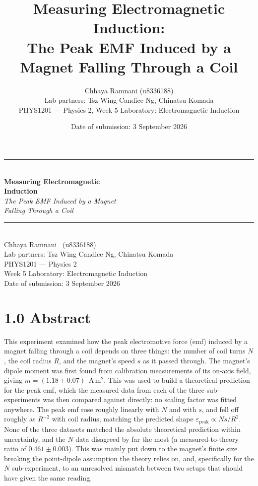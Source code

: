 \documentclass{article}
\title{\textbf{\Large Measuring Electromagnetic Induction:\\[2pt] The Peak EMF Induced by a Magnet Falling Through a Coil}}
\author{Chhaya Ramnani (u8336188)\\ \small Lab partners: Tsz Wing Candice Ng, Chinatsu Komada\\ \small PHYS1201 --- Physics 2, Week 5 Laboratory: Electromagnetic Induction}
\date{Date of submission: 3 September 2026}
\begin{document}
 
\begin{titlepage}
\centering
\vspace*{3cm}
{\color{indigoline}\rule{0.5\linewidth}{0.6pt}}\\[0.6cm]
{\Huge\bfseries\color{indigo} Measuring Electromagnetic\\[4pt] Induction}\\[10pt]
{\Large\itshape The Peak EMF Induced by a Magnet\\ Falling Through a Coil}\\[0.6cm]
{\color{indigoline}\rule{0.5\linewidth}{0.6pt}}\\[1.8cm]
{\large Chhaya Ramnani \ \textnormal{(u8336188)}}\\[6pt]
{\normalsize Lab partners: Tsz Wing Candice Ng, Chinatsu Komada}\\[1.4cm]
{\normalsize PHYS1201 --- Physics 2}\\
{\normalsize Week 5 Laboratory: Electromagnetic Induction}\\[1.2cm]
{\normalsize Date of submission: 3 September 2026}
\vfill
\end{titlepage}
 
\setcounter{page}{1}
 
\section*{1.0 Abstract}
This experiment examined how the peak electromotive force (emf) induced by a magnet falling 
through a coil depends on three things: the number of coil turns $N$, the coil radius $R$, and 
the magnet's speed $s$ as it passed through. The magnet's dipole moment was first found from calibration 
measurements of its on-axis field, giving $m = (1.18 \pm 0.07)$~A\,m$^2$. This was used to build a 
theoretical prediction for the peak emf, which the measured data from each of the three sub-experiments 
was then compared against directly: no scaling factor was fitted anywhere. The peak emf rose 
roughly linearly with $N$ and with $s$, and fell off roughly as $R^{-2}$ with coil radius, matching the 
predicted shape $\varepsilon_{\text{peak}} \propto Ns/R^2$. None of the three datasets matched 
the absolute theoretical prediction within uncertainty, and the $N$ data disagreed by far the most 
(a measured-to-theory ratio of $0.461 \pm 0.003$). This was mainly put down to the magnet's finite size 
breaking the point-dipole assumption the theory relies on, and, specifically for the $N$ sub-experiment, 
to an unresolved mismatch between two setups that should have given the same reading.
 
\end{document}

